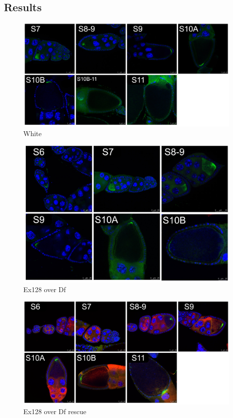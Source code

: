 \documentclass{article}
\begin{document}
\newpage
\subsection*{Results}

\begin{figure}[H]
	\centering
	\includegraphics[width=0.9\linewidth]{img/confocal/confocal_white_hblock}
	\caption{White}
	\label{fig:confocalwhitehblock}
\end{figure}

\begin{figure}[H]
	\centering
	\includegraphics[width=0.9\linewidth]{img/confocal/confocal_ex128_Df_hblock}
	\caption{Ex128 over Df}
	\label{fig:confocalex128dfhblock}
\end{figure}

\begin{figure}[H]
	\centering
	\includegraphics[width=0.9\linewidth]{img/confocal/confocal_ex128_Df_rescue_hblock}
	\caption{Ex128 over Df rescue}
	\label{fig:confocalex128dfrescuehblock}
\end{figure}
\end{document}
